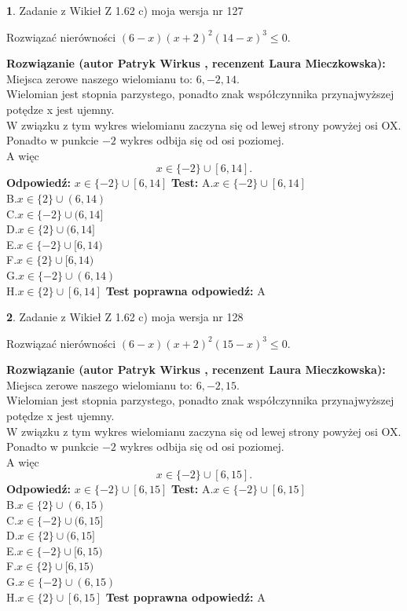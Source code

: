 \documentclass[12pt, a4paper]{article}
\theoremstyle{definition} %
\newtheorem{zad}{}
\newcommand{\zadStart}[1]{\begin{zad}#1\newline}
\newcommand{\zadStop}{\end{zad}}
\newcommand{\rozwStart}[2]{\noindent \textbf{Rozwiązanie (autor #1 , recenzent #2): }\newline}
\newcommand{\rozwStop}{\newline}
\newcommand{\odpStart}{\noindent \textbf{Odpowiedź:}\newline}
\newcommand{\odpStop}{\newline}
\newcommand{\testStart}{\noindent \textbf{Test:}\newline}
\newcommand{\testStop}{\newline}
\newcommand{\kluczStart}{\noindent \textbf{Test poprawna odpowiedź:}\newline}
\newcommand{\kluczStop}{\newline}
\begin{document}
\zadStart{Zadanie z Wikieł Z 1.62 c) moja wersja nr 127}

Rozwiązać nierówności $(6-x)(x+2)^{2}(14-x)^{3}\le0$.
\zadStop
\rozwStart{Patryk Wirkus}{Laura Mieczkowska}
Miejsca zerowe naszego wielomianu to: $6, -2, 14$.\\
Wielomian jest stopnia parzystego, ponadto znak współczynnika przy\linebreak najwyższej potędze x jest ujemny.\\ W związku z tym wykres wielomianu zaczyna się od lewej strony powyżej osi OX.\\
Ponadto w punkcie $-2$ wykres odbija się od osi poziomej.\\
A więc $$x \in \{-2\} \cup [6,14].$$
\rozwStop
\odpStart
$x \in \{-2\} \cup [6,14]$
\odpStop
\testStart
A.$x \in \{-2\} \cup [6,14]$\\
B.$x \in \{2\} \cup (6,14)$\\
C.$x \in \{-2\} \cup (6,14]$\\
D.$x \in \{2\} \cup (6,14]$\\
E.$x \in \{-2\} \cup [6,14)$\\
F.$x \in \{2\} \cup [6,14)$\\
G.$x \in \{-2\} \cup (6,14)$\\
H.$x \in \{2\} \cup [6,14]$
\testStop
\kluczStart
A
\kluczStop



\zadStart{Zadanie z Wikieł Z 1.62 c) moja wersja nr 128}

Rozwiązać nierówności $(6-x)(x+2)^{2}(15-x)^{3}\le0$.
\zadStop
\rozwStart{Patryk Wirkus}{Laura Mieczkowska}
Miejsca zerowe naszego wielomianu to: $6, -2, 15$.\\
Wielomian jest stopnia parzystego, ponadto znak współczynnika przy\linebreak najwyższej potędze x jest ujemny.\\ W związku z tym wykres wielomianu zaczyna się od lewej strony powyżej osi OX.\\
Ponadto w punkcie $-2$ wykres odbija się od osi poziomej.\\
A więc $$x \in \{-2\} \cup [6,15].$$
\rozwStop
\odpStart
$x \in \{-2\} \cup [6,15]$
\odpStop
\testStart
A.$x \in \{-2\} \cup [6,15]$\\
B.$x \in \{2\} \cup (6,15)$\\
C.$x \in \{-2\} \cup (6,15]$\\
D.$x \in \{2\} \cup (6,15]$\\
E.$x \in \{-2\} \cup [6,15)$\\
F.$x \in \{2\} \cup [6,15)$\\
G.$x \in \{-2\} \cup (6,15)$\\
H.$x \in \{2\} \cup [6,15]$
\testStop
\kluczStart
A
\kluczStop
\end{document}
